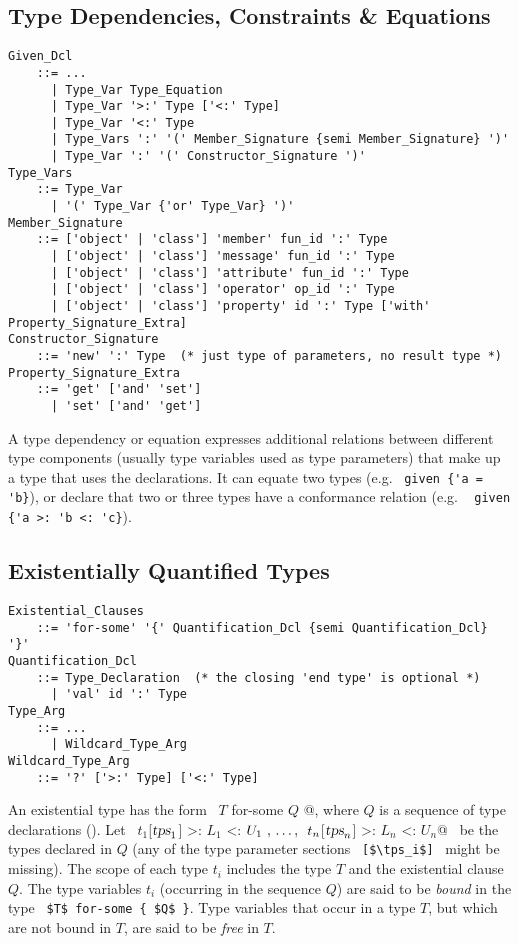 \subsection{Type Dependencies, Constraints \& Equations}

\grammar\begin{lstlisting}
Given_Dcl 
    ::= ...
      | Type_Var Type_Equation
      | Type_Var '>:' Type ['<:' Type]
      | Type_Var '<:' Type
      | Type_Vars ':' '(' Member_Signature {semi Member_Signature} ')'
      | Type_Var ':' '(' Constructor_Signature ')'
Type_Vars 
    ::= Type_Var
      | '(' Type_Var {'or' Type_Var} ')'
Member_Signature
    ::= ['object' | 'class'] 'member' fun_id ':' Type
      | ['object' | 'class'] 'message' fun_id ':' Type
      | ['object' | 'class'] 'attribute' fun_id ':' Type
      | ['object' | 'class'] 'operator' op_id ':' Type
      | ['object' | 'class'] 'property' id ':' Type ['with' Property_Signature_Extra]
Constructor_Signature
    ::= 'new' ':' Type  (* just type of parameters, no result type *)
Property_Signature_Extra
    ::= 'get' ['and' 'set']
      | 'set' ['and' 'get']
\end{lstlisting}

A type dependency or equation expresses additional relations between different type components (usually type variables used as type parameters) that make up a type that uses the  declarations. It can equate two types (e.g. ~\lstinline!given {'a = 'b}!), or declare that two or three types have a conformance relation (e.g. ~ \lstinline!given {'a >: 'b <: 'c}!).





\subsection{Existentially Quantified Types}
\label{sec:existential-types}

\grammar\begin{lstlisting}
Existential_Clauses
    ::= 'for-some' '{' Quantification_Dcl {semi Quantification_Dcl} '}'
Quantification_Dcl
    ::= Type_Declaration  (* the closing 'end type' is optional *)
      | 'val' id ':' Type
Type_Arg
    ::= ...
      | Wildcard_Type_Arg
Wildcard_Type_Arg
    ::= '?' ['>:' Type] ['<:' Type] 
\end{lstlisting}

An existential type has the form ~\lstinline@$T$ for-some { $Q$ }@, where $Q$ is a sequence of type declarations (). Let ~\lstinline@$t_1$[$\mbox{\sl tps}_1$] >: $L_1$ <: $U_1\ ,\, \ldots ,\,\ t_n$[$\mbox{\sl tps}_n$] >: $L_n$ <: $U_n$@~ be the types declared in $Q$ (any of the type parameter sections ~\lstinline![$\tps_i$]!~ might be missing). The scope of each type $t_i$ includes the type $T$ and the existential clause $Q$. The type variables $t_i$ (occurring in the sequence $Q$) are said to be {\em bound} in the type ~\lstinline!$T$ for-some { $Q$ }!. Type variables that occur in a type $T$, but which are not bound in $T$, are said to be {\em free} in $T$. 

